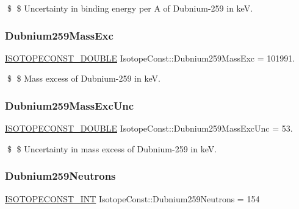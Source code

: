 \$ \$ Uncertainty in binding energy per A of Dubnium-\/259 in keV. \mbox{\label{group___isotope_const-_dubnium-_db259_gadbc014b1ceaafdfa05f964b5816dd3ae}} 
\subsubsection{\texorpdfstring{Dubnium259\+Mass\+Exc}{Dubnium259MassExc}}
{\footnotesize\ttfamily \mbox{\hyperlink{group___isotope_const-_macros_ga8f45a7272ce02c0b4c65c44636ed719a}{I\+S\+O\+T\+O\+P\+E\+C\+O\+N\+S\+T\+\_\+\+D\+O\+U\+B\+LE}} Isotope\+Const\+::\+Dubnium259\+Mass\+Exc = 101991.}

\$ \$ Mass excess of Dubnium-\/259 in keV. \mbox{\label{group___isotope_const-_dubnium-_db259_gae015b2a7fb97454a8b221440447be203}} 
\subsubsection{\texorpdfstring{Dubnium259\+Mass\+Exc\+Unc}{Dubnium259MassExcUnc}}
{\footnotesize\ttfamily \mbox{\hyperlink{group___isotope_const-_macros_ga8f45a7272ce02c0b4c65c44636ed719a}{I\+S\+O\+T\+O\+P\+E\+C\+O\+N\+S\+T\+\_\+\+D\+O\+U\+B\+LE}} Isotope\+Const\+::\+Dubnium259\+Mass\+Exc\+Unc = 53.}

\$ \$ Uncertainty in mass excess of Dubnium-\/259 in keV. \mbox{\label{group___isotope_const-_dubnium-_db259_ga076085c5b67b3a34cdb0cd0f8efb7c45}} 
\subsubsection{\texorpdfstring{Dubnium259\+Neutrons}{Dubnium259Neutrons}}
{\footnotesize\ttfamily \mbox{\hyperlink{group___isotope_const-_macros_ga5f18360b3e99483a35c32d789e62621c}{I\+S\+O\+T\+O\+P\+E\+C\+O\+N\+S\+T\+\_\+\+I\+NT}} Isotope\+Const\+::\+Dubnium259\+Neutrons = 154}


